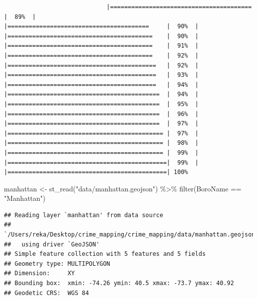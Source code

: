 \documentclass[
  krantz2]{krantz}
\makeatletter
\newenvironment{Shaded}{\begin{snugshade}}{\end{snugshade}}
\newcommand{\FunctionTok}[1]{\textcolor[rgb]{0,0,0}{#1}}
\newcommand{\NormalTok}[1]{#1}
\newcommand{\OtherTok}[1]{\textcolor[rgb]{0.37,0.37,0.37}{#1}}
\newcommand{\SpecialCharTok}[1]{\textcolor[rgb]{0,0,0}{#1}}
\newcommand{\StringTok}[1]{\textcolor[rgb]{0.5,0.5,0.5}{#1}}
\newenvironment{kframe}{%
\medskip{}
\setlength{\fboxsep}{.8em}
 \def\at@end@of@kframe{}%
 \ifinner\ifhmode%
  \def\at@end@of@kframe{\end{minipage}}%
  \begin{minipage}{\columnwidth}%
 \fi\fi%
 \def\FrameCommand##1{\hskip\@totalleftmargin \hskip-\fboxsep
 \colorbox{shadecolor}{##1}\hskip-\fboxsep
     \hskip-\linewidth \hskip-\@totalleftmargin \hskip\columnwidth}%
 \MakeFramed {\advance\hsize-\width
   \@totalleftmargin\z@ \linewidth\hsize
   \@setminipage}}%
 {\par\unskip\endMakeFramed%
 \at@end@of@kframe}
\renewenvironment{Shaded}{\begin{kframe}}{\end{kframe}}
\makeatother
\begin{document}
\begin{verbatim}
                             |========================================     |  89%  |                                                     |========================================     |  90%  |                                                     |=========================================    |  90%  |                                                     |=========================================    |  91%  |                                                     |=========================================    |  92%  |                                                     |==========================================   |  92%  |                                                     |==========================================   |  93%  |                                                     |==========================================   |  94%  |                                                     |===========================================  |  94%  |                                                     |===========================================  |  95%  |                                                     |===========================================  |  96%  |                                                     |===========================================  |  97%  |                                                     |============================================ |  97%  |                                                     |============================================ |  98%  |                                                     |============================================ |  99%  |                                                     |=============================================|  99%  |                                                     |=============================================| 100%
\end{verbatim}

\begin{Shaded}
\begin{Highlighting}[]
\NormalTok{manhattan }\OtherTok{\textless{}{-}} \FunctionTok{st\_read}\NormalTok{(}\StringTok{"data/manhattan.geojson"}\NormalTok{) }\SpecialCharTok{\%\textgreater{}\%}
  \FunctionTok{filter}\NormalTok{(BoroName }\SpecialCharTok{==} \StringTok{"Manhattan"}\NormalTok{)}
\end{Highlighting}
\end{Shaded}

\begin{verbatim}
## Reading layer `manhattan' from data source 
##   `/Users/reka/Desktop/crime_mapping/crime_mapping/data/manhattan.geojson' 
##   using driver `GeoJSON'
## Simple feature collection with 5 features and 5 fields
## Geometry type: MULTIPOLYGON
## Dimension:     XY
## Bounding box:  xmin: -74.26 ymin: 40.5 xmax: -73.7 ymax: 40.92
## Geodetic CRS:  WGS 84
\end{verbatim}
\end{document}

